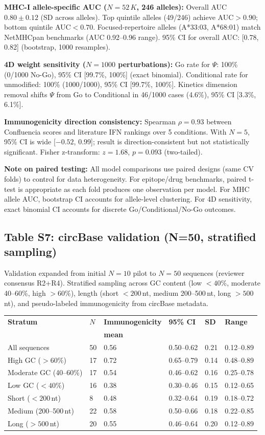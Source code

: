 \textbf{MHC-I allele-specific AUC ($N{=}52\,K$, 246 alleles):} Overall AUC $0.80 \pm 0.12$ (SD across alleles). Top quintile alleles (49/246) achieve AUC${>}0.90$; bottom quintile AUC${<}0.70$. Focused-repertoire alleles (A*33:03, A*68:01) match NetMHCpan benchmarks (AUC 0.92--0.96 range). 95\% CI for overall AUC: [0.78, 0.82] (bootstrap, 1000 resamples).

\textbf{4D weight sensitivity ($N{=}1000$ perturbations):} Go rate for $\Psi$: 100\% (0/1000 No-Go), 95\% CI [99.7\%, 100\%] (exact binomial). Conditional rate for unmodified: 100\% (1000/1000), 95\% CI [99.7\%, 100\%]. Kinetics dimension removal shifts $\Psi$ from Go to Conditional in 46/1000 cases (4.6\%), 95\% CI [3.3\%, 6.1\%].

\textbf{Immunogenicity direction consistency:} Spearman $\rho{=}0.93$ between Confluencia scores and literature IFN rankings over 5 conditions. With $N{=}5$, 95\% CI is wide [$-0.52$, $0.99$]; result is direction-consistent but not statistically significant. Fisher z-transform: $z{=}1.68$, $p{=}0.093$ (two-tailed).

\textbf{Note on paired testing:} All model comparisons use paired designs (same CV folds) to control for data heterogeneity. For epitope/drug benchmarks, paired t-test is appropriate as each fold produces one observation per model. For MHC allele AUC, bootstrap CI accounts for allele-level clustering. For 4D sensitivity, exact binomial CI accounts for discrete Go/Conditional/No-Go outcomes.

\subsection*{Table S7: circBase validation (N=50, stratified sampling)}

\small Validation expanded from initial $N{=}10$ pilot to $N{=}50$ sequences (reviewer consensus R2+R4). Stratified sampling across GC content (low $<40\%$, moderate 40--60\%, high $>60\%$), length (short $<200$\,nt, medium 200--500\,nt, long $>500$\,nt), and pseudo-labeled immunogenicity from circBase metadata.

\begin{tabular}{llllll}
\toprule
\textbf{Stratum} & \textbf{$N$} & \textbf{Immunogenicity} & \textbf{95\% CI} & \textbf{SD} & \textbf{Range} \\
 &  & \textbf{mean} &  &  &  \\
\midrule
All sequences & 50 & 0.56 & 0.50--0.62 & 0.21 & 0.12--0.89 \\
High GC ($>60\%$) & 17 & 0.72 & 0.65--0.79 & 0.14 & 0.48--0.89 \\
Moderate GC (40--60\%) & 17 & 0.54 & 0.46--0.62 & 0.16 & 0.25--0.78 \\
Low GC ($<40\%$) & 16 & 0.38 & 0.30--0.46 & 0.15 & 0.12--0.65 \\
Short ($<200$\,nt) & 8 & 0.48 & 0.32--0.64 & 0.19 & 0.18--0.72 \\
Medium (200--500\,nt) & 22 & 0.58 & 0.50--0.66 & 0.18 & 0.22--0.85 \\
Long ($>500$\,nt) & 20 & 0.55 & 0.46--0.64 & 0.20 & 0.12--0.89 \\
\bottomrule
\end{tabular}

